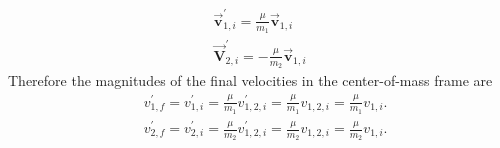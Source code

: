  $$\begin{gathered}
 \overrightarrow{\mathbf{v}}_{1, i}^{\prime}=\frac{\mu}{m_{1}} \overrightarrow{\mathbf{v}}_{1, i} \\
 \overrightarrow{\mathbf{V}}_{2, i}^{\prime}=-\frac{\mu}{m_{2}} \overrightarrow{\mathbf{v}}_{1, i}
 \end{gathered}$$
 Therefore the magnitudes of the final velocities in the center-of-mass frame are
 $$
 \begin{aligned}
 &v_{1, f}^{\prime}=v_{1, i}^{\prime}=\frac{\mu}{m_{1}} v_{1,2, i}^{\prime}=\frac{\mu}{m_{1}} v_{1,2, i}=\frac{\mu}{m_{1}} v_{1, i} . \\
 &v_{2, f}^{\prime}=v_{2, i}^{\prime}=\frac{\mu}{m_{2}} v_{1,2, i}^{\prime}=\frac{\mu}{m_{2}} v_{1,2, i}=\frac{\mu}{m_{2}} v_{1, i} .
 \end{aligned}
 $$